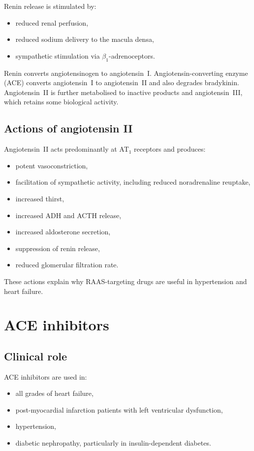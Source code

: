 \documentclass[11pt,a4paper]{article}
\begin{document}
Renin release is stimulated by:
\begin{itemize}
    \item reduced renal perfusion,
    \item reduced sodium delivery to the macula densa,
    \item sympathetic stimulation via $\beta_1$-adrenoceptors.
\end{itemize}

Renin converts angiotensinogen to angiotensin~I. Angiotensin-converting enzyme (ACE) converts angiotensin~I to angiotensin~II and also degrades bradykinin. Angiotensin~II is further metabolised to inactive products and angiotensin~III, which retains some biological activity.

\subsection{Actions of angiotensin II}

Angiotensin~II acts predominantly at AT$_1$ receptors and produces:
\begin{itemize}
    \item potent vasoconstriction,
    \item facilitation of sympathetic activity, including reduced noradrenaline reuptake,
    \item increased thirst,
    \item increased ADH and ACTH release,
    \item increased aldosterone secretion,
    \item suppression of renin release,
    \item reduced glomerular filtration rate.
\end{itemize}

These actions explain why RAAS-targeting drugs are useful in hypertension and heart failure.

\section{ACE inhibitors}

\subsection{Clinical role}

ACE inhibitors are used in:
\begin{itemize}
    \item all grades of heart failure,
    \item post-myocardial infarction patients with left ventricular dysfunction,
    \item hypertension,
    \item diabetic nephropathy, particularly in insulin-dependent diabetes.
\end{itemize}
\end{document}
